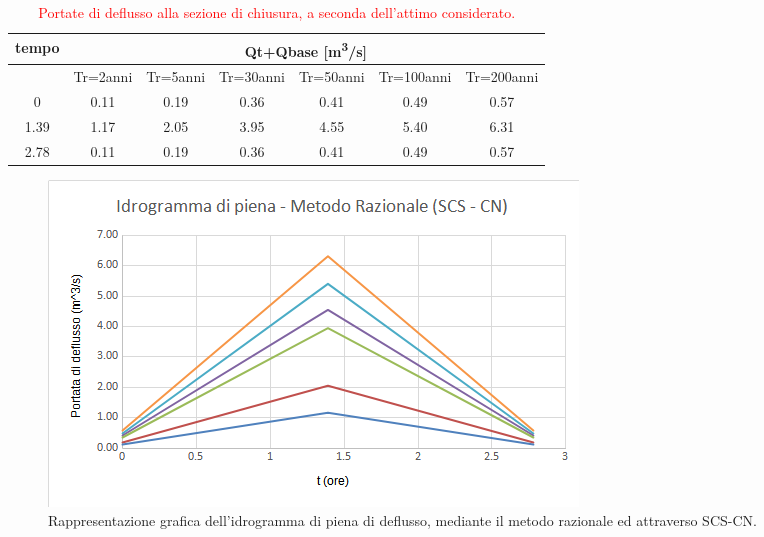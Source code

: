 \begin{table}[H] \centering
    \caption{\textcolor{red}{Portate di deflusso alla sezione di chiusura, a seconda dell'attimo considerato.}}
    \begin{tabular}{ccccccc}
        \toprule
    tempo & \multicolumn{6}{c}{Qt+Qbase [\unit{m^3/s}]}           \\
    \midrule
& Tr=2anni & Tr=5anni & Tr=30anni & Tr=50anni & Tr=100anni & Tr=200anni \\
0 & 0.11  & 0.19     & 0.36      & 0.41      & 0.49       & 0.57       \\ 1.39 & 1.17  & 2.05  & 3.95      & 4.55      & 5.40       & 6.31       \\
2.78 & 0.11 & 0.19     & 0.36      & 0.41      & 0.49       & 0.57 \\
\bottomrule     
    \end{tabular}
    \end{table}

\begin{figure}[H]  \centering
        \includegraphics[scale=0.75]{immagini/metodo_razionale_scs_cn.png}
        \caption{Rappresentazione grafica dell'idrogramma di piena di deflusso, mediante il metodo razionale ed attraverso SCS-CN.}
        \label{metodo_razionale_scs_cn}
\end{figure}

